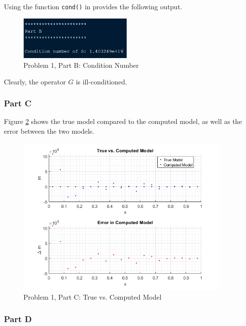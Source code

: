 Using the function \texttt{cond()} in \MATLAB provides the following output.

\begin{figure}[h] \label{fig: prob 1 part b}
	\centering
	\includegraphics[width=0.5\textwidth]{./images/prob1_partb.png}
	\caption{Problem 1, Part B: Condition Number}
\end{figure}
\FloatBarrier

Clearly, the operator $G$ is ill-conditioned.


\subsubsection*{Part C}

Figure \ref{fig: prob 1 part c} shows the true model compared to the computed model, as well as the error between the two models. 

\begin{figure}[h] \label{fig: prob 1 part c}
	\centering
	\includegraphics[width=0.95\textwidth]{./images/prob1_partc.png}
	\caption{Problem 1, Part C: True vs. Computed Model}
\end{figure}
\FloatBarrier


\subsubsection*{Part D}

